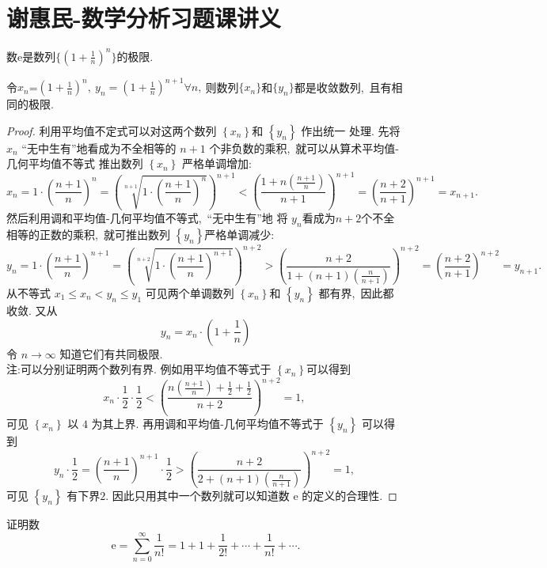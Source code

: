 \section{谢惠民-数学分析习题课讲义}
\begin{definition}
	数$\mathrm{e}$是数列$\{\left(1+\frac{1}{n}\right)^n\}$的极限.
\end{definition}
\begin{theorem}
	令$x_n$=$\left(1+\frac{1}{n}\right)^n,\ y_n=\left(1+\frac{1}{n}\right)^{n+1}\forall n,\ $则数列$\{x_n\}$和$\{y_n\}$都是收敛数列,\ 且有相同的极限.
\end{theorem}
\begin{proof}
	利用平均值不定式可以对这两个数列  $\left\{x_{n}\right\}  $和  $\left\{y_{n}\right\}$  作出统一 处理. 先将  $x_{n} $ “无中生有”地看成为不全相等的 $ n+1 $ 个非负数的乘积,\  就可以从算术平均值-几何平均值不等式 推出数列  $\left\{x_{n}\right\}$  严格单调增加:
	$$x_{n}=1\cdot\left(\frac{n+1}{n}\right)^{n}=\left(\sqrt[n+1]{1\cdot\left(\frac{n+1}{n}\right)^{n}}\right)^{n+1}<\left(\frac{1+n\left(\frac{n+1}{n}\right)}{n+1}\right)^{n+1}=\left(\frac{n+2}{n+1}\right)^{n+1}=x_{n+1} .$$
	然后利用调和平均值-几何平均值不等式,\  “无中生有”地 将 $ y_{n}  $看成为$  n+2  $个不全相等的正数的乘积,\  就可推出数列  $\left\{y_{n}\right\}  $严格单调减少:
	$$y_{n}=1 \cdot\left(\frac{n+1}{n}\right)^{n+1}=\left(\sqrt[n+2]{1\cdot\left(\frac{n+1}{n}\right)^{n+1}}\right)^{n+2}>\left(\frac{n+2}{1+(n+1)\left(\frac{n}{n+1}\right)}\right)^{n+2}=\left(\frac{n+2}{n+1}\right)^{n+2}=y_{n+1} .$$
	从不等式  $x_{1} \leqslant x_{n}<y_{n} \leqslant y_{1} $ 可见两个单调数列 $ \left\{x_{n}\right\}  $和 $ \left\{y_{n}\right\} $ 都有界,\  因此都 收敛. 又从
	$$y_{n}=x_{n} \cdot\left(1+\frac{1}{n}\right)$$
	令  $n \rightarrow \infty $ 知道它们有共同极限.\\
	注:可以分别证明两个数列有界. 例如用平均值不等式于  $\left\{x_{n}\right\}  $可以得到
	$$x_{n} \cdot \frac{1}{2} \cdot \frac{1}{2}<\left(\frac{n\left(\frac{n+1}{n}\right)+\frac{1}{2}+\frac{1}{2}}{n+2}\right)^{n+2}=1,\ $$
	可见  $\left\{x_{n}\right\} $ 以 $4$ 为其上界. 再用调和平均值-几何平均值不等式于  $\left\{y_{n}\right\} $ 可以得到	
	$$y_{n} \cdot \frac{1}{2}=\left(\frac{n+1}{n}\right)^{n+1} \cdot \frac{1}{2}>\left(\frac{n+2}{2+(n+1)\left(\frac{n}{n+1}\right)}\right)^{n+2}=1,\ $$
	可见 $\left\{y_{n}\right\} $ 有下界$ 2 .$ 因此只用其中一个数列就可以知道数  $\mathrm{e}$  的定义的合理性.
\end{proof}
\begin{problem}
	证明数
	$$\mathrm{e}=\sum\limits_{n=0}^{\infty}\frac{1}{n!}=1+1+\frac{1}{2!}+\cdots+\frac{1}{n!}+\cdots.$$
\end{problem}
